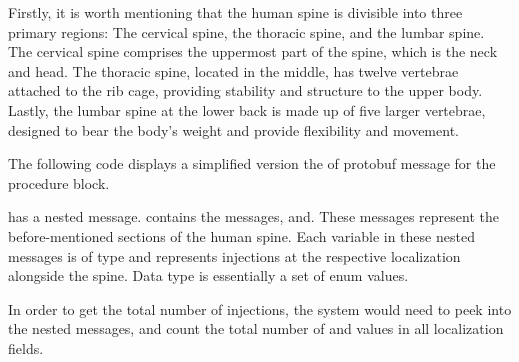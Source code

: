 Firstly, it is worth mentioning that the human spine is divisible into three primary regions:
The cervical spine, the thoracic spine, and the lumbar spine.
The cervical spine comprises the uppermost part of the spine, which is the neck and head.
The thoracic spine, located in the middle, has twelve vertebrae attached to the rib cage, providing stability and structure to the upper body.
Lastly, the lumbar spine at the lower back is made up of five larger vertebrae, designed to bear the body's weight and provide flexibility and movement.


The following code displays a simplified version the of protobuf message for the procedure block.


 has a nested message.
 contains the messages, and.
These messages represent the before-mentioned sections of the human spine.
Each variable in these nested messages is of type and represents injections at the respective localization alongside the spine.
Data type is essentially a set of enum values.

In order to get the total number of injections, the system would need to peek into the nested messages, and count the total number of  and  values in all localization fields.

